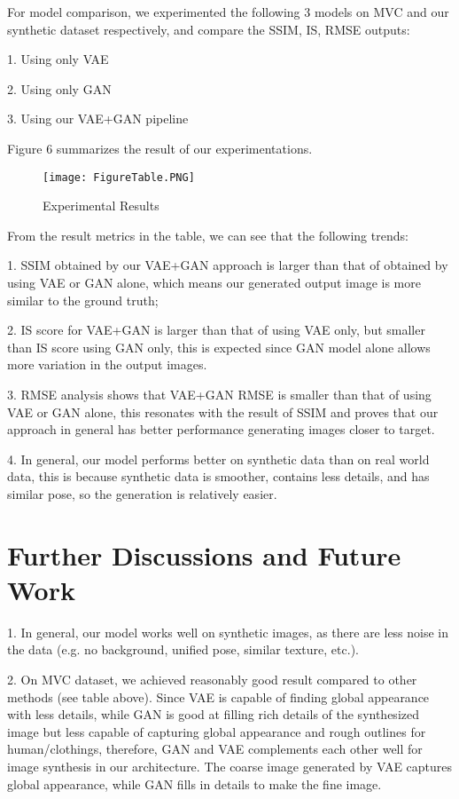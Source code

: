 \documentclass[10pt,conference]{IEEEtran}
\begin{document}
For model comparison, we experimented the following 3 models on MVC and our synthetic dataset respectively, and compare the SSIM, IS, RMSE outputs:

1. Using only VAE

2. Using only GAN

3. Using our VAE+GAN pipeline

Figure 6 summarizes the result of our experimentations.
\begin{figure*}
  \texttt{[image: FigureTable.PNG]}
  \caption{Experimental Results}
  \label{fig:boat1}
\end{figure*}

From the result metrics in the table, we can see that the following trends: 

1. SSIM obtained by our VAE+GAN approach is larger than that of obtained by using VAE or GAN alone, which means our generated output image is more similar to the ground truth; 

2. IS score for VAE+GAN is larger than that of using VAE only, but smaller than IS score using GAN only, this is expected since GAN model alone allows more variation in the output images. 

3. RMSE analysis shows that VAE+GAN RMSE is smaller than that of using VAE or GAN alone, this resonates with the result of SSIM and proves that our approach in general has better performance generating images closer to target. 

4. In general, our model performs better on synthetic data than on real world data, this is because synthetic data is smoother, contains less details, and has similar pose, so the generation is relatively easier. 


\section{Further Discussions and Future Work}

1. In general, our model works well on synthetic images, as there are less noise in the data (e.g. no background, unified pose, similar texture, etc.).

2. On MVC dataset, we achieved reasonably good result compared to other methods (see table above). Since VAE is capable of finding 
global appearance with less details, while GAN is good at filling rich details of the synthesized image but less capable of capturing 
global appearance and rough outlines for human/clothings, therefore, GAN and VAE complements each other well for image synthesis 
in our architecture. The coarse image generated by VAE captures global appearance, while GAN fills in details to make the fine image.
\end{document}
